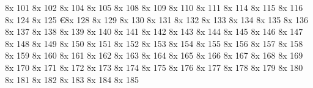 \characterdef \esuperior   8x   101
\characterdef \fsuperior   8x   102
\characterdef \hsuperior   8x   104
\characterdef \isuperior   8x   105
\characterdef \lsuperior   8x   108
\characterdef \msuperior   8x   109
\characterdef \nsuperior   8x   110
\characterdef \osuperior   8x   111
\characterdef \rsuperior   8x   114
\characterdef \ssuperior   8x   115
\characterdef \tsuperior   8x   116
\characterdef \centsuperior   8x   124
\characterdef \florinsuperior   8x   125
\characterdef \euro           8x   128
\characterdef \eurosuperior   8x   129
\characterdef \zeronumr   8x   130
\characterdef \onenumr   8x   131
\characterdef \twonumr   8x   132
\characterdef \threenumr   8x   133
\characterdef \fournumr   8x   134
\characterdef \fivenumr   8x   135
\characterdef \sixnumr   8x   136
\characterdef \sevennumr   8x   137
\characterdef \eightnumr   8x   138
\characterdef \ninenumr   8x   139
\characterdef \zerodnom   8x   140
\characterdef \onednom   8x   141
\characterdef \twodnom   8x   142
\characterdef \threednom   8x   143
\characterdef \fourdnom   8x   144
\characterdef \fivednom   8x   145
\characterdef \sixdnom   8x   146
\characterdef \sevendnom   8x   147
\characterdef \eightdnom   8x   148
\characterdef \ninednom   8x   149
\characterdef \zeroinferior   8x   150
\characterdef \oneinferior   8x   151
\characterdef \twoinferior   8x   152
\characterdef \threeinferior   8x   153
\characterdef \fourinferior   8x   154
\characterdef \fiveinferior   8x   155
\characterdef \sixinferior   8x   156
\characterdef \seveninferior   8x   157
\characterdef \eightinferior   8x   158
\characterdef \nineinferior   8x   159
\characterdef \equivasymptotic   8x   160
\characterdef \equivalence   8x   161
\characterdef \precedes   8x   162
\characterdef \precedesequal   8x   163
\characterdef \lessmuch   8x   164
\characterdef \greatermuch   8x   165
\characterdef \follows   8x   166
\characterdef \followsequal   8x   167
\characterdef \element   8x   168
\characterdef \owner   8x   169
\characterdef \propersubset   8x   170
\characterdef {}   8x   171
\characterdef \propersuperset   8x   172
\characterdef {}   8x   173
\characterdef \arrowsouthwest   8x   174
\characterdef \arrowsoutheast   8x   175
\characterdef \arrownorthwest   8x   176
\characterdef \arrownortheast   8x   177
\characterdef \arrowleft   8x   178
\characterdef \arrowright   8x   179
\characterdef \arrowboth   8x   180
\characterdef \arrowup   8x   181
\characterdef \arrowdown   8x   182
\characterdef \arrowdblleft   8x   183
\characterdef \arrowdblright   8x   184
\characterdef \arrowdblup   8x   185
